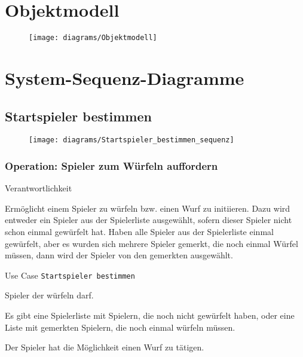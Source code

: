\newpage
\section{Objektmodell}
\begin{figure}[h]
  \begin{center}
    \texttt{[image: diagrams/Objektmodell]}
  \end{center}
\end{figure}

\newpage
\section{System-Sequenz-Diagramme}
\subsection{Startspieler bestimmen}
\begin{figure}[h]
  \begin{center}
    \texttt{[image: diagrams/Startspieler\_bestimmen\_sequenz]}
  \end{center}
\end{figure}

\subsubsection{Operation: Spieler zum Würfeln auffordern}
\begin{labeling}[:]{Verantwortlichkeit}
\item [Verantwortlichkeit] Ermöglicht einem Spieler zu würfeln bzw. einen Wurf zu initiieren. Dazu wird entweder ein Spieler aus der Spielerliste ausgewählt, sofern dieser Spieler nicht schon einmal gewürfelt hat. Haben alle Spieler aus der Spielerliste einmal gewürfelt, aber es wurden sich mehrere Spieler gemerkt, die noch einmal Würfel müssen, dann wird der Spieler von den gemerkten ausgewählt.
\item [Referenzen] Use Case \texttt{Startspieler bestimmen}
\item [Output] Spieler der würfeln darf.
\item [Vorbedingungen] Es gibt eine Spielerliste mit Spielern, die noch nicht gewürfelt haben, oder eine Liste mit gemerkten Spielern, die noch einmal würfeln müssen.
\item [Nachbedingungen] Der Spieler hat die Möglichkeit einen Wurf zu tätigen.
\end{labeling}


